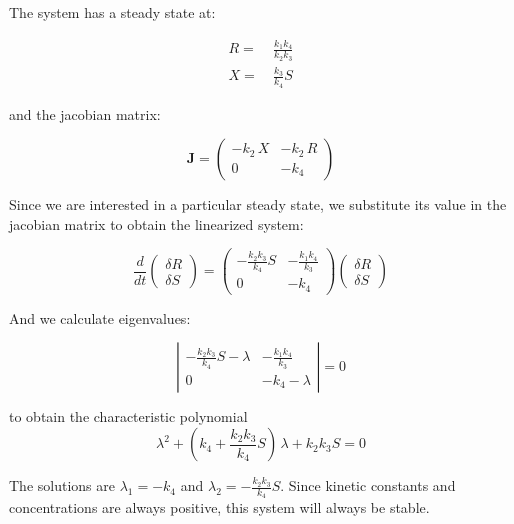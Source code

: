 \documentclass{tufte-book} %
\begin{document}
The system has a steady state at:

\begin{align}
	R =&\: \frac{k_1 k_4}{k_2 k_3}  \nonumber\\
	X =&\: \frac{k_3}{k_4}S \nonumber
\end{align}

and the jacobian matrix:

\begin{equation}
\mathbf{J} =	 \begin{pmatrix} - k_2 \, X &  - k_2 \, R \\   0  & -k_4 	\end{pmatrix} \nonumber
\end{equation}

Since we are interested in a particular steady state, we substitute its value in the jacobian matrix to obtain the linearized system:

\begin{equation}
\frac{d}{dt}	 \begin{pmatrix} \delta R \\ \delta S	\end{pmatrix} =	 \begin{pmatrix} - \frac{k_2 k_3}{k_4}S &  - \frac{k_1 k_4}{k_3} \\   0  & -k_4 	\end{pmatrix} \begin{pmatrix} \delta R \\ \delta S	\end{pmatrix} \nonumber
\end{equation}

And we calculate eigenvalues:

\begin{equation}
\left| \begin{matrix} - \frac{k_2 k_3}{k_4}S - \lambda &  - \frac{k_1 k_4}{k_3} \\   0  & -k_4-\lambda 	\end{matrix} \right|=0 \nonumber
\end{equation}

to obtain the characteristic polynomial
\begin{equation}
	\lambda^2 + \left( k_4 + \frac{k_2 k_3}{k_4}S \right) \, \lambda +k_2 k_3 S=0 \nonumber
\end{equation}

The solutions are $\lambda_1 = -k_4$ and $\lambda_2=-\frac{k_2 k_3}{k_4}S$. Since kinetic constants and concentrations are always positive, this system will always be stable.
\end{document}
